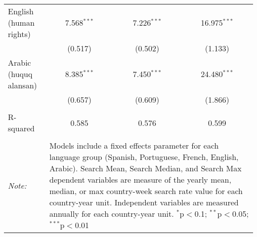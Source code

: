 \begin{table}[!htbp]
\begin{tabular}{@{\extracolsep{5pt}}lccc}
  English (human rights) & 7.568$^{***}$ & 7.226$^{***}$ & 16.975$^{***}$ \\ 
  & (0.517) & (0.502) & (1.133) \\ 
  Arabic (huquq alansan) & 8.385$^{***}$ & 7.450$^{***}$ & 24.480$^{***}$ \\ 
  & (0.657) & (0.609) & (1.866) \\ 
 \hline \\[-1.8ex] 
R-squared  & 0.585 & 0.576 & 0.599 \\ 
\hline 
\hline \\[-1.8ex] 
\textit{Note:}  & \multicolumn{3}{l}{\parbox[t]{8cm}{Models include a fixed effects parameter for each language group (Spanish, Portuguese, French, English, Arabic). Search Mean, Search Median, and Search Max dependent variables are measure of the yearly mean, median, or max country-week search rate value for each country-year unit. Independent variables are measured annually for each country-year unit. $^{*}$p$<$0.1; $^{**}$p$<$0.05; $^{***}$p$<$0.01}} \\ 
\end{tabular} 
\end{table} 
